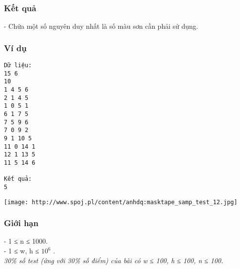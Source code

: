 \subsubsection{   Kết quả  }

   - Chứa một số nguyên duy nhất là số màu sơn cần phải sử dụng.  

\subsubsection{   Ví dụ  }
\begin{verbatim}
Dữ liệu:
15 6
10
1 4 5 6
2 1 4 5
1 0 5 1
6 1 7 5
7 5 9 6
7 0 9 2
9 1 10 5
11 0 14 1
12 1 13 5
11 5 14 6

Kết quả:
5
\end{verbatim}
\texttt{[image: http://www.spoj.pl/content/anhdq:masktape\_samp\_test\_12.jpg]}

\subsubsection{   Giới hạn  }

   - 1 ≤ n ≤ 1000.   
\\   - 1 ≤ w, h ≤ $10^{6}$   .   
\\\textit{     30\% số test (ứng với 30\% số điểm) của bài có  w ≤ 100, h ≤ 100, n ≤ 100.    }
